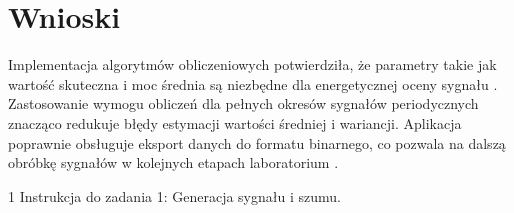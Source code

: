\documentclass[12pt]{article}
\begin{document}
\section{Wnioski}
Implementacja algorytmów obliczeniowych potwierdziła, że parametry takie jak wartość skuteczna i moc średnia są niezbędne dla energetycznej oceny sygnału \cite{1}. Zastosowanie wymogu obliczeń dla pełnych okresów sygnałów periodycznych znacząco redukuje błędy estymacji wartości średniej i wariancji. Aplikacja poprawnie obsługuje eksport danych do formatu binarnego, co pozwala na dalszą obróbkę sygnałów w kolejnych etapach laboratorium \cite{1}.


\begin{thebibliography}{1}
 Instrukcja do zadania 1: Generacja sygnału i szumu.
\end{thebibliography}
\end{document}
